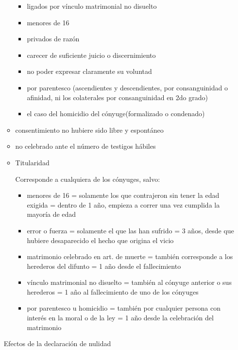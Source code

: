 \documentclass[]{article}
\providecommand{\tightlist}{%
  \setlength{\itemsep}{0pt}\setlength{\parskip}{0pt}}
\begin{document}
\begin{itemize}
\begin{itemize}
    \begin{itemize}
    \tightlist
    \item
      ligados por vínculo matrimonial no disuelto
    \item
      menores de 16
    \item
      privados de razón
    \item
      carecer de suficiente juicio o discernimiento
    \item
      no poder expresar claramente su voluntad
    \item
      por parentesco (ascendientes y descendientes, por consanguinidad o
      afinidad, ni los colaterales por consanguinidad en 2do grado)
    \item
      el caso del homicidio del cónyuge(formalizado o condenado)
    \end{itemize}
  \item
    consentimiento no hubiere sido libre y espontáneo
  \item
    no celebrado ante el número de testigos hábiles
  \item
    Titularidad

    Corresponde a cualquiera de los cónyuges, salvo:

    \begin{itemize}
    \tightlist
    \item
      menores de 16 = solamente los que contrajeron sin tener la edad
      exigida = dentro de 1 año, empieza a correr una vez cumplida la
      mayoría de edad
    \item
      error o fuerza = solamente el que las han sufrido = 3 años, desde
      que hubiere desaparecido el hecho que origina el vicio
    \item
      matrimonio celebrado en art. de muerte = también corresponde a los
      herederos del difunto = 1 año desde el fallecimiento
    \item
      vínculo matrimonial no disuelto = también al cónyuge anterior o
      sus herederos = 1 año al fallecimiento de uno de los cónyuges
    \item
      por parentesco u homicidio = también por cualquier persona con
      interés en la moral o de la ley = 1 año desde la celebración del
      matrimonio
    \end{itemize}
  \end{itemize}

  Efectos de la declaración de nulidad


\end{itemize}
\end{document}
